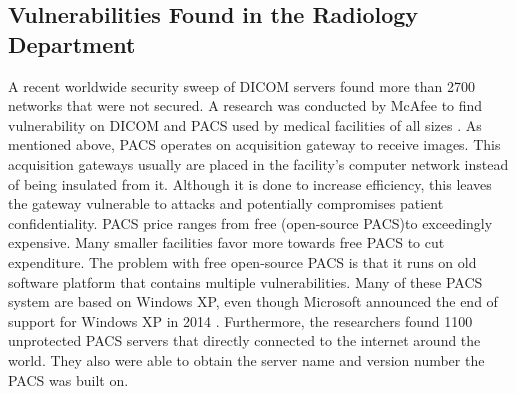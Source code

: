 \documentclass[pdf,bookmarks,colorlinks=true]{IEEEtran}
\begin{document}
\subsection{Vulnerabilities Found in the Radiology Department}
A recent worldwide security sweep of DICOM servers found more than 2700 networks that were not secured. A research was conducted by McAfee to find vulnerability on DICOM and PACS used by medical facilities of all sizes \cite{McAfee}. As mentioned above, PACS operates on acquisition gateway to receive images. This acquisition gateways usually are placed in the facility's computer network instead of being insulated from it. Although it is done to increase efficiency, this leaves the gateway vulnerable to attacks and potentially compromises patient confidentiality. PACS price ranges from free (open-source PACS)to exceedingly expensive. Many smaller facilities favor more towards free PACS to cut expenditure. The problem with free open-source PACS is that it runs on old software platform that contains multiple vulnerabilities. Many of these PACS system are based on Windows XP, even though Microsoft announced the end of support for Windows XP in 2014 \cite{ma2019medical}. Furthermore, the researchers found 1100 unprotected PACS servers that directly connected to the internet around the world. They also were able to obtain the server name and version number the PACS was built on. \par 
\end{document}
